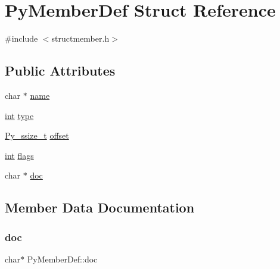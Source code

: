 \hypertarget{struct_py_member_def}{}\section{Py\+Member\+Def Struct Reference}
\label{struct_py_member_def}


{\ttfamily \#include $<$structmember.\+h$>$}

\subsection*{Public Attributes}
\begin{DoxyCompactItemize}
\item 
char $\ast$ \mbox{\hyperlink{struct_py_member_def_a20cf4c6ed77b26a0d87fc718a02aad35}{name}}
\item 
\mbox{\hyperlink{warnings_8h_a74f207b5aa4ba51c3a2ad59b219a423b}{int}} \mbox{\hyperlink{struct_py_member_def_ac76ca02c4307d56613dee98c198e569f}{type}}
\item 
\mbox{\hyperlink{pyport_8h_ac6411a3dfda9ac6feb9e8d859b1184bc}{Py\+\_\+ssize\+\_\+t}} \mbox{\hyperlink{struct_py_member_def_a78c440b432b027928ec9a7c88cff74d7}{offset}}
\item 
\mbox{\hyperlink{warnings_8h_a74f207b5aa4ba51c3a2ad59b219a423b}{int}} \mbox{\hyperlink{struct_py_member_def_a1579e768952c3350fe8510f164cea15d}{flags}}
\item 
char $\ast$ \mbox{\hyperlink{struct_py_member_def_a52eba722acb02c6745ea662056a1479c}{doc}}
\end{DoxyCompactItemize}


\subsection{Member Data Documentation}
\mbox{\label{struct_py_member_def_a52eba722acb02c6745ea662056a1479c}} 
\subsubsection{\texorpdfstring{doc}{doc}}
{\footnotesize\ttfamily char$\ast$ Py\+Member\+Def\+::doc}

\mbox{\label{struct_py_member_def_a1579e768952c3350fe8510f164cea15d}} 
